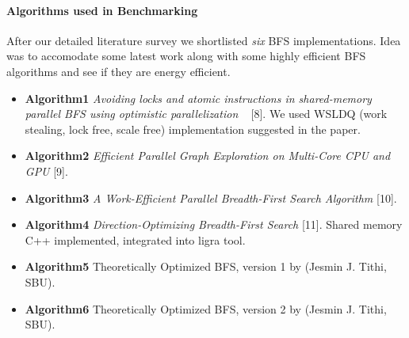\paragraph{Algorithms used in Benchmarking}
After our detailed literature survey we shortlisted \emph{six} BFS
implementations.  Idea was to accomodate some latest work along with some
highly efficient BFS algorithms and see if they are energy efficient.
\begin{itemize}[leftmargin=*]
\item \textbf{Algorithm1}
\emph{Avoiding locks and atomic instructions in shared-memory parallel
BFS using optimistic parallelization} ~\cite{WSLDQ-BFS} [8]. We used WSLDQ (work
stealing, lock free, scale free) implementation suggested in the
paper.
\item \textbf{Algorithm2}
\emph{Efficient Parallel Graph Exploration on Multi-Core CPU and GPU}
[9].
\item \textbf{Algorithm3}
\emph{A Work-Efficient Parallel Breadth-First Search Algorithm} [10].
\item \textbf{Algorithm4}
\emph{Direction-Optimizing Breadth-First Search} [11]. Shared memory
C++ implemented, integrated into ligra tool.
\item \textbf{Algorithm5}
Theoretically Optimized BFS, version 1 by (Jesmin J. Tithi, SBU).
\item \textbf{Algorithm6}
Theoretically Optimized BFS, version 2 by (Jesmin J. Tithi, SBU).
\end{itemize}


